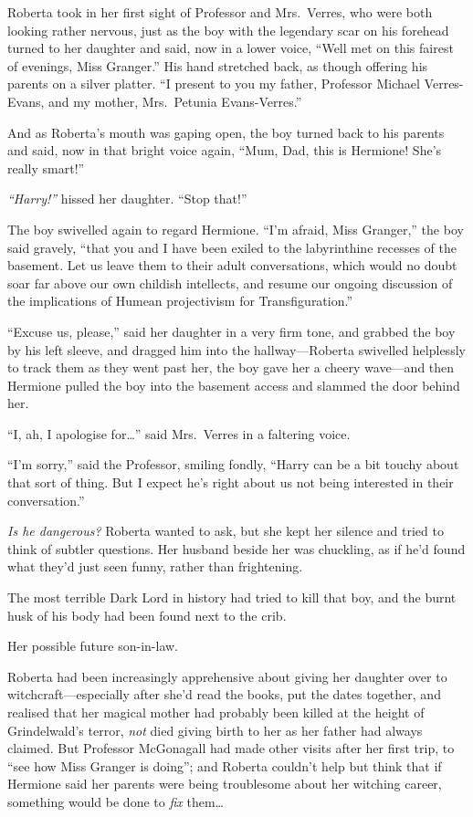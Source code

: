 Roberta took in her first sight of Professor and Mrs.~Verres, who were
both looking rather nervous, just as the boy with the legendary scar on
his forehead turned to her daughter and said, now in a lower voice,
``Well met on this fairest of evenings, Miss Granger.'' His hand
stretched back, as though offering his parents on a silver platter. ``I
present to you my father, Professor Michael Verres-Evans, and my mother,
Mrs.~Petunia Evans-Verres.''

And as Roberta's mouth was gaping open, the boy turned back to his
parents and said, now in that bright voice again, ``Mum, Dad, this is
Hermione! She's really smart!''

\emph{``Harry!''} hissed her daughter. ``Stop that!''

The boy swivelled again to regard Hermione. ``I'm afraid, Miss
Granger,'' the boy said gravely, ``that you and I have been exiled to
the labyrinthine recesses of the basement. Let us leave them to their
adult conversations, which would no doubt soar far above our own
childish intellects, and resume our ongoing discussion of the
implications of Humean projectivism for Transfiguration.''

``Excuse us, please,'' said her daughter in a very firm tone, and
grabbed the boy by his left sleeve, and dragged him into the
hallway---Roberta swivelled helplessly to track them as they went past
her, the boy gave her a cheery wave---and then Hermione pulled the boy
into the basement access and slammed the door behind her.

``I, ah, I apologise for\ldots{}'' said Mrs.~Verres in a faltering
voice.

``I'm sorry,'' said the Professor, smiling fondly, ``Harry can be a bit
touchy about that sort of thing. But I expect he's right about us not
being interested in their conversation.''

\emph{Is he dangerous?} Roberta wanted to ask, but she kept her silence
and tried to think of subtler questions. Her husband beside her was
chuckling, as if he'd found what they'd just seen funny, rather than
frightening.

The most terrible Dark Lord in history had tried to kill that boy, and
the burnt husk of his body had been found next to the crib.

Her possible future son-in-law.

Roberta had been increasingly apprehensive about giving her daughter
over to witchcraft---especially after she'd read the books, put the
dates together, and realised that her magical mother had probably been
killed at the height of Grindelwald's terror, \emph{not} died giving
birth to her as her father had always claimed. But Professor McGonagall
had made other visits after her first trip, to ``see how Miss Granger is
doing''; and Roberta couldn't help but think that if Hermione said her
parents were being troublesome about her witching career, something
would be done to \emph{fix} them\ldots{}

